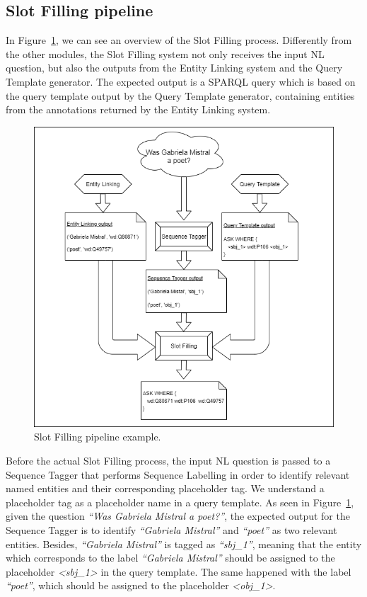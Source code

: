 \subsection{Slot Filling pipeline}
In Figure~\ref{fig:slotFillingPipeline}, we can see an overview of the Slot Filling process. 
Differently from the other modules, the Slot Filling system not only receives the input NL 
question, but also the outputs from the Entity Linking system and the Query Template generator. 
The expected output is a SPARQL query which is based on the query template output by the 
Query Template generator, containing entities from the annotations returned by the Entity 
Linking system.

\begin{figure}[!h]
    \centering
    \includegraphics[scale=.45]{imagenes/3_system_overview/slotFillingPipeline.png}
    \caption{Slot Filling pipeline example.}
    \label{fig:slotFillingPipeline}
\end{figure}

Before the actual Slot Filling process, the input NL question is passed to a Sequence Tagger 
that performs Sequence Labelling in order to identify relevant named entities and their 
corresponding placeholder tag. We understand a placeholder tag as a placeholder name in a 
query template. As seen in Figure~\ref{fig:slotFillingPipeline}, given the question 
\textit{“Was Gabriela Mistral a poet?”}, the expected output for the Sequence Tagger is to 
identify \textit{“Gabriela Mistral”} and \textit{“poet”} as two relevant entities. Besides, 
\textit{“Gabriela Mistral”} is tagged as \textit{“sbj\_1”}, meaning that the entity which 
corresponds to the label \textit{“Gabriela Mistral”} should be assigned to the placeholder 
\textit{<sbj\_1>} in the query template. The same happened with the label \textit{“poet”}, 
which should be assigned to the placeholder \textit{<obj\_1>}.

